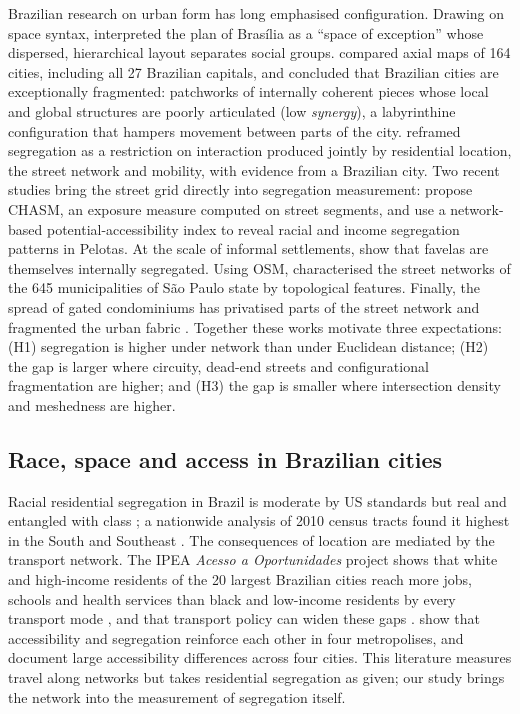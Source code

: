 Brazilian research on urban form has long emphasised configuration. Drawing on space syntax,
\citet{holanda2002espaco} interpreted the plan of Bras\'ilia as a ``space of exception'' whose dispersed,
hierarchical layout separates social groups. \citet{medeiros2013urbis} compared axial maps of 164 cities, including
all 27 Brazilian capitals, and concluded that Brazilian cities are exceptionally fragmented: patchworks of
internally coherent pieces whose local and global structures are poorly articulated (low \emph{synergy}), a
labyrinthine configuration that hampers movement between parts of the city. \citet{netto2015segregated} reframed
segregation as a restriction on interaction produced jointly by residential location, the street network and
mobility, with evidence from a Brazilian city. Two recent studies bring the street grid directly into segregation
measurement: \citet{saboya2025chasm} propose CHASM, an exposure measure computed on street segments, and
\citet{goncalves2024uncovering} use a network-based potential-accessibility index to reveal racial and income
segregation patterns in Pelotas. At the scale of informal settlements, \citet{carvalho2023segregation} show that
favelas are themselves internally segregated. Using OSM, \citet{spadon2018topological} characterised the street
networks of the 645 municipalities of S\~ao Paulo state by topological features. Finally, the spread of gated
condominiums has privatised parts of the street network and fragmented the urban fabric \citep{coy2006gated}.
Together these works motivate three expectations: (H1) segregation is higher under network than under Euclidean
distance; (H2) the gap is larger where circuity, dead-end streets and configurational fragmentation are higher;
and (H3) the gap is smaller where intersection density and meshedness are higher.

\subsection{Race, space and access in Brazilian cities}

Racial residential segregation in Brazil is moderate by US standards but real and entangled with class
\citep{telles2004race}; a nationwide analysis of 2010 census tracts found it highest in the South and Southeast
\citep{sousafilho2023segregacao}. The consequences of location are mediated by the transport network. The IPEA
\emph{Acesso a Oportunidades} project shows that white and high-income residents of the 20 largest Brazilian
cities reach more jobs, schools and health services than black and low-income residents by every transport mode
\citep{pereira2019desigualdades,tomasiello2024racial}, and that transport policy can widen these gaps
\citep{pereira2019distributional}. \citet{bittencourt2021cumulative} show that accessibility and segregation
reinforce each other in four metropolises, and \citet{boisjoly2020accessibility} document large accessibility
differences across four cities. This literature measures travel along networks
\citep{pereira2021r5r} but takes residential segregation as given; our study brings the network into the
measurement of segregation itself.
